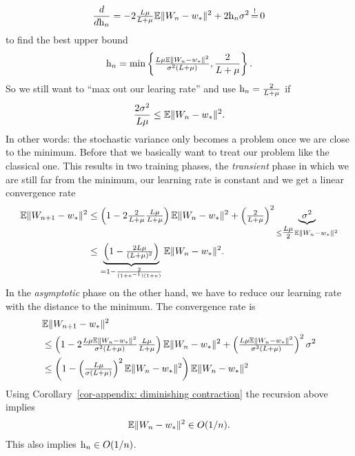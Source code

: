\begin{align*}
	\frac{d}{d\lr_n}
	= -2\tfrac{\ubound\lbound}{\ubound+\lbound}
	\E\|\Weights_n - \minimum\|^2 + 2\lr_n \stdBound^2
	\xeq{!} 0
\end{align*}
to find the best upper bound
\begin{align*}
	\text{h}_n
	= \min\left\{
		\tfrac{L\mu\mathbb{E}\|W_n - w_*\|^2}{\sigma^2(L+\mu)},
		\frac{2}{L+\mu}
	\right\}.
\end{align*}
So we still want to ``max out our learing rate'' and use
\(\text{h}_n=\tfrac{2}{L+\mu}\) if
\begin{align*}
	\frac{2\sigma^2}{L\mu} \le \mathbb{E}\|W_n - w_*\|^2.
\end{align*}
In other words: the stochastic variance only becomes a problem once we are
close to the minimum. Before that we basically want to treat our problem like
the classical one. This results in two training phases, the \emph{transient}
phase in which we are still far from the minimum, our learning rate is constant
and we get a linear convergence rate
\begin{align*}
	\mathbb{E}\|W_{n+1} - w_*\|^2
	&\le \left(1-2\tfrac{2}{L+\mu}\tfrac{L\mu}{L+\mu}\right)
	\mathbb{E}\|W_n - w_*\|^2 + \left(\tfrac{2}{L+\mu}\right)^2
	\underbrace{\sigma^2}_{
		\le\tfrac{L\mu}{2} \mathbb{E}\|W_n - w_*\|^2
	}\\
	&\le \underbrace{
		\left(1-\tfrac{2L\mu}{(L+\mu)^2}\right)
	}_{
		=1-\frac{2}{(1+\kappa^{-1})(1+\kappa)}
	}
	\mathbb{E}\|W_n - w_*\|^2.
\end{align*}
In the \emph{asymptotic} phase on the other hand, we have to reduce our learning
rate with the distance to the minimum. The convergence rate is
\begin{align*}
	&\mathbb{E}\|W_{n+1} - w_*\|^2\\
	&\le \left(1-2
		\tfrac{L\mu\mathbb{E}\|W_n - w_*\|^2}{\sigma^2(L+\mu)}
		\tfrac{L\mu}{L+\mu}
	\right)
	\mathbb{E}\|W_n - w_*\|^2
	+ \left(
		\tfrac{L\mu\mathbb{E}\|W_n - w_*\|^2}{\sigma^2(L+\mu)}
	\right)^2
	\sigma^2\\
	&\le \left(1-
		\left(\tfrac{L\mu}{\sigma(L+\mu)}\right)^2
		\mathbb{E}\|W_n - w_*\|^2
	\right)
	\mathbb{E}\|W_n - w_*\|^2
\end{align*}
Using Corollary~\ref{cor-appendix: diminishing contraction} the recursion above
implies
\begin{align*}
	\mathbb{E}\|W_n - w_*\|^2\in O(1/n).
\end{align*}
This also implies \(\text{h}_n\in O(1/n)\).

